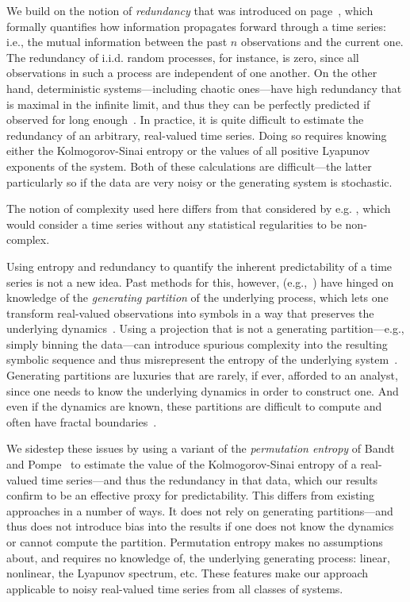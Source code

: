 We build on the notion of \emph{redundancy} that was introduced on
page~\pageref{page:redundancy}, which formally quantifies how
information propagates forward through a time series:
i.e., the mutual information between the past $n$ observations and the
current one.
% 
The redundancy of i.i.d. random processes, for instance, is zero,
since all observations in such a process are independent of one
another.  On the other hand, deterministic systems---including chaotic
ones---have high redundancy that is maximal in the infinite limit, 
and thus they can be perfectly predicted if observed for long 
enough~\cite{weigend93}.  In practice, it is
quite difficult to estimate the redundancy of an arbitrary,
real-valued time series.  Doing so requires knowing either the
Kolmogorov-Sinai entropy or the values of all positive Lyapunov
exponents of the system.  Both of these calculations are
difficult---the latter particularly so if the data are very noisy or
the generating system is stochastic.

The notion of complexity used here differs from that considered by
e.g. \cite{Shalizi2008}, which would consider a time series without
any statistical regularities to be non-complex.  

Using entropy and redundancy to quantify the inherent predictability
of a time series is not a new idea.  Past methods for this, however,
(e.g.,~\cite{Shannon1951, mantegna1994linguistic}) have hinged on
knowledge of the \emph{generating partition} of the underlying
process, which lets one transform real-valued observations into
symbols in a way that preserves the underlying dynamics~\cite{lind95}.
Using a projection that is not a generating partition---e.g., simply
binning the data---can introduce spurious complexity into the
resulting symbolic sequence and thus misrepresent the entropy of the
underlying system~\cite{bollt2001}.  Generating partitions are
luxuries that are rarely, if ever, afforded to an analyst, since one
needs to know the underlying dynamics in order to construct one.  And
even if the dynamics are known, these partitions are difficult to
compute and often have fractal boundaries~\cite{eisele1999}.

We sidestep these issues by using a variant of the \emph{permutation
  entropy} of Bandt and Pompe~\cite{bandt2002per} to estimate the
value of the Kolmogorov-Sinai entropy of a real-valued time
series---and thus the redundancy in that data, which our results
confirm to be an effective proxy for predictability.  This differs
from existing approaches in a number of ways.  It does not rely on
generating partitions---and thus does not introduce bias into the
results if one does not know the dynamics or cannot compute the
partition.  Permutation entropy makes no assumptions about, and
requires no knowledge of, the underlying generating process: linear,
nonlinear, the Lyapunov spectrum, etc.  These features make our
approach applicable to noisy real-valued time series from all classes
of systems.

